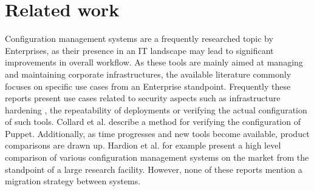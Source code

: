 \section{Related work}\label{sec:relatedwork}
Configuration management systems are a frequently researched topic by Enterprises, as their presence in an IT landscape may lead to significant improvements in overall workflow. As these tools are mainly aimed at managing and maintaining corporate infrastructures, the available literature commonly focuses on specific use cases from an Enterprise standpoint. Frequently these reports present use cases related to security aspects such as infrastructure hardening \cite{dotson2014security}, the repeatability of deployments \cite{ruiz2015reconstructable} or verifying the actual configuration of such tools. Collard et al. \cite{Collard2015} describe a method for verifying the configuration of Puppet. Additionally, as time progresses and new tools become available, product comparisons are drawn up. Hardion et al. \cite{Hardion2013} for example present a high level comparison of various configuration management systems on the market from the standpoint of a large research facility. However, none of these reports mention a migration strategy between systems.

